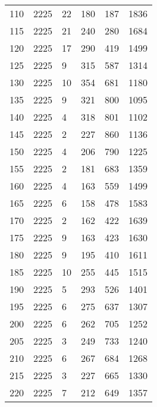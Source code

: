 \begin{longtable}{|l|l|l|l|l|l|}
		110 & 2225 & 22  & 180  & 187  & 1836\\
		115 & 2225 & 21  & 240  & 280  & 1684\\
		120 & 2225 & 17  & 290  & 419  & 1499\\
		125 & 2225 & 9   & 315  & 587  & 1314\\
		130 & 2225 & 10  & 354  & 681  & 1180\\
		135 & 2225 & 9   & 321  & 800  & 1095\\
		140 & 2225 & 4   & 318  & 801  & 1102\\
		145 & 2225 & 2   & 227  & 860  & 1136\\
		150 & 2225 & 4   & 206  & 790  & 1225\\
		155 & 2225 & 2   & 181  & 683  & 1359\\
		160 & 2225 & 4   & 163  & 559  & 1499\\
		165 & 2225 & 6   & 158  & 478  & 1583\\
		170 & 2225 & 2   & 162  & 422  & 1639\\
		175 & 2225 & 9   & 163  & 423  & 1630\\
		180 & 2225 & 9   & 195  & 410  & 1611\\
		185 & 2225 & 10  & 255  & 445  & 1515\\
		190 & 2225 & 5   & 293  & 526  & 1401\\
		195 & 2225 & 6   & 275  & 637  & 1307\\
		200 & 2225 & 6   & 262  & 705  & 1252\\
		205 & 2225 & 3   & 249  & 733  & 1240\\
		210 & 2225 & 6   & 267  & 684  & 1268\\
		215 & 2225 & 3   & 227  & 665  & 1330\\
		220 & 2225 & 7   & 212  & 649  & 1357\\
		\bottomrule
\end{longtable}